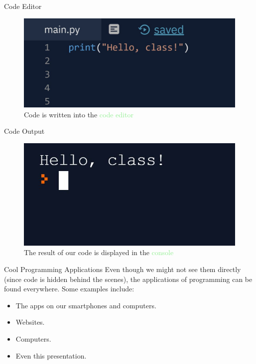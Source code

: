 \documentclass[hyperref={pdfpagemode=FullScreen},aspectratio=169]{beamer}
\begin{document}
  \begin{frame}{Code Editor}
    \begin{figure}
      \includegraphics[scale=0.35]{./imgs/helloClassCode.jpg}
      {\caption*{Code is written into the \textcolor{lightGreen}{code editor}}}
    \end{figure}
  \end{frame}
  
  \begin{frame}{Code Output}
    \begin{figure}
      \includegraphics[scale=0.5]{./imgs/helloClassConsoleOutput.jpg}
      {\caption*{The result of our code is displayed in the \textcolor{lightGreen}{console}}} 
    \end{figure}
  \end{frame}
  
  \begin{frame}{Cool Programming Applications}
    Even though we might not see them directly (since code is hidden behind the scenes), the applications of programming can be found everywhere. Some examples include: 
    \begin{itemize}
      \item The apps on our smartphones and computers. 
      \item Websites.
      \item Computers. 
      \item Even this presentation.
      
    \end{itemize}
  \end{frame}
  
\end{document}
